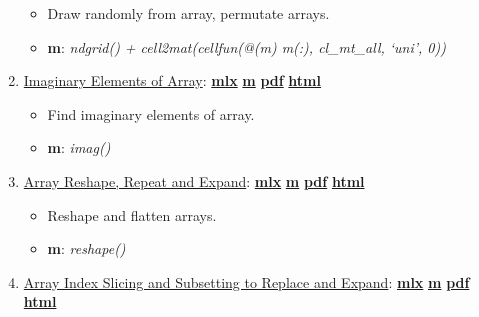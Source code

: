 \documentclass[
]{book}
\providecommand{\tightlist}{%
  \setlength{\itemsep}{0pt}\setlength{\parskip}{0pt}}
\begin{document}
\begin{enumerate}
  \begin{itemize}
  \tightlist
  \item
    Draw randomly from array, permutate arrays.
  \item
    \textbf{m}: \emph{ndgrid() + cell2mat(cellfun(@(m) m(:), cl\_mt\_all, `uni', 0))}
  \end{itemize}
\item
  \href{https://fanwangecon.github.io/M4Econ/amto/array/htmlpdfm/fs_img.html}{Imaginary Elements of Array}: \href{https://github.com/FanWangEcon/M4Econ/blob/master/amto/array/fs_img.mlx}{\textbf{mlx}} \textbar{} \href{https://github.com/FanWangEcon/M4Econ/blob/master/amto/array/htmlpdfm/fs_img.m}{\textbf{m}} \textbar{} \href{https://github.com/FanWangEcon/M4Econ/blob/master/amto/array/htmlpdfm/fs_img.pdf}{\textbf{pdf}} \textbar{} \href{https://fanwangecon.github.io/M4Econ/amto/array/htmlpdfm/fs_img.html}{\textbf{html}}

  \begin{itemize}
  \tightlist
  \item
    Find imaginary elements of array.
  \item
    \textbf{m}: \emph{imag()}
  \end{itemize}
\item
  \href{https://fanwangecon.github.io/M4Econ/amto/array/htmlpdfm/fs_reshape.html}{Array Reshape, Repeat and Expand}: \href{https://github.com/FanWangEcon/M4Econ/blob/master/amto/array/fs_reshape.mlx}{\textbf{mlx}} \textbar{} \href{https://github.com/FanWangEcon/M4Econ/blob/master/amto/array/htmlpdfm/fs_reshape.m}{\textbf{m}} \textbar{} \href{https://github.com/FanWangEcon/M4Econ/blob/master/amto/array/htmlpdfm/fs_reshape.pdf}{\textbf{pdf}} \textbar{} \href{https://fanwangecon.github.io/M4Econ/amto/array/htmlpdfm/fs_reshape.html}{\textbf{html}}

  \begin{itemize}
  \tightlist
  \item
    Reshape and flatten arrays.
  \item
    \textbf{m}: \emph{reshape()}
  \end{itemize}
\item
  \href{https://fanwangecon.github.io/M4Econ/amto/array/htmlpdfm/fs_slicing.html}{Array Index Slicing and Subsetting to Replace and Expand}: \href{https://github.com/FanWangEcon/M4Econ/blob/master/amto/array/fs_slicing.mlx}{\textbf{mlx}} \textbar{} \href{https://github.com/FanWangEcon/M4Econ/blob/master/amto/array/htmlpdfm/fs_slicing.m}{\textbf{m}} \textbar{} \href{https://github.com/FanWangEcon/M4Econ/blob/master/amto/array/htmlpdfm/fs_slicing.pdf}{\textbf{pdf}} \textbar{} \href{https://fanwangecon.github.io/M4Econ/amto/array/htmlpdfm/fs_slicing.html}{\textbf{html}}


\end{enumerate}
\end{document}
